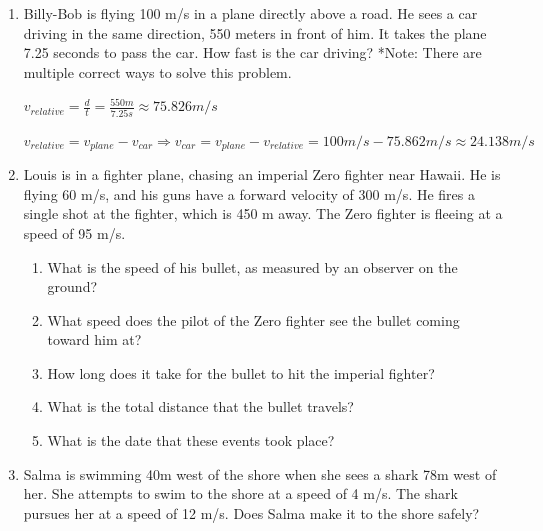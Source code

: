 \documentclass[letterpaper, 12pt]{article}
\begin{document}
\begin{enumerate}
\item Billy-Bob is flying 100 m/s in a plane directly above a road.  He sees a car driving in the same direction, 550 meters in front of him.  It takes the plane 7.25 seconds to pass the car.  How fast is the car driving? \color{red} *Note: There are multiple correct ways to solve this problem.  

\begin{center} $v_{relative}= \frac{d}{t} = \frac{550m}{7.25s} \approx 75.826 m/s $
	
	$ v_{relative} = v_{plane} - v_{car} \Longrightarrow v_{car} = v_{plane} - v_{relative}  = 100m/s - 75.862 m/s \approx 24.138 m/s $
	
\end{center}

\color{black}




\item Louis is in a fighter plane, chasing an imperial Zero fighter near Hawaii.  He is flying 60 m/s, and his guns have a forward velocity of 300 m/s.  He fires a single shot at the fighter, which is 450 m away.  The Zero fighter is fleeing at a speed of 95 m/s.
\begin{enumerate}
	\item What is the speed of his bullet, as measured by an observer on the ground?
	\vspace{.75in}
	\item What speed does the pilot of the Zero fighter see the bullet coming toward him at?
	\vspace{.75in}
	\item How long does it take for the bullet to hit the imperial fighter?
	\vspace{.75in}
	\item What is the total distance that the bullet travels?
	\vspace{.75in}
	\item What is the date that these events took place?
\end{enumerate}

\vspace{.75in}
\item Salma is swimming 40m west of the shore when she sees a shark 78m west of her.  She attempts to swim to the shore at a speed of 4 m/s.  The shark pursues her at a speed of 12 m/s.  Does Salma make it to the shore safely? 







	
\end{enumerate}
 
\end{document}
